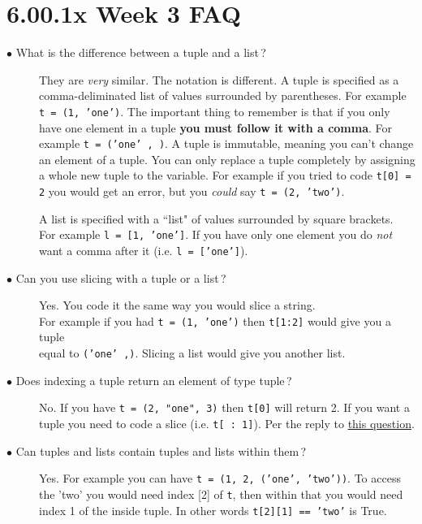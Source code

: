 \documentclass{article}
\newcommand{\inlinecode}[1]{\texttt{#1}}
\newcommand{\link}[2]{\textcolor{blue}{\href{#2}{#1}}}
\newcommand{\question}[1]{\item[$\bullet$ #1] \hfil}
\newenvironment{answer}{\newline}{}
\newenvironment{faq}{\begin{description}}{\end{description}}
\begin{document}
	
	\section*{\Huge6.00.1x Week 3 FAQ}
	
	\begin{faq}
		\question{What is the difference between a tuple and a list\,?}
		\begin{answer}
			They are \textit{very} similar. The notation is different. A tuple is specified as a comma-deliminated list of values surrounded by parentheses.  For example \inlinecode{t = (1, 'one')}.  The important thing to remember is that if you only have one element in a tuple \textbf{you must follow it with a comma}. For example \inlinecode{t = ('one' , )}. A tuple is immutable, meaning you can't change an element of a tuple.  You can only replace a tuple completely by assigning a whole new tuple to the variable.  For example if you tried to code \inlinecode{t[0] = 2} you would get an error, but you \textit{could} say \inlinecode{t = (2, 'two')}.
			
			A list is specified with a ``list" of values surrounded by square brackets.\\For example \inlinecode{l = [1, 'one']}.  If you have only one element you do \textit{not} want a comma after it (i.e. \inlinecode{l = ['one']}).
		\end{answer}
		
		\question{Can you use slicing with a tuple or a list\,?}
		\begin{answer}
			Yes.  You code it the same way you would slice a string.\\For example if you had \inlinecode{t = (1, 'one')} then \inlinecode{t[1:2]} would give you a tuple\\equal to \inlinecode{('one' ,)}. Slicing a list would give you another list.
		\end{answer}
		
		\question{Does indexing a tuple return an element of type tuple\,?}
		\begin{answer}
			No. If you have \inlinecode{t = (2,  "one", 3)} then \inlinecode{t[0]} will return 2.  If you want a tuple you need to code a slice (i.e. \inlinecode{t[ : 1]}). Per the reply to \link{this question}{https://courses.edx.org/courses/course-v1:MITx+6.00.1x+2T2017\_2/discussion/forum/35e127f944e149742273bc1b58766b721cd95c85/threads/5a6d725b24451a09d9000216}.
		\end{answer}
		
		\question{Can tuples and lists contain tuples and lists within them\,?}
		\begin{answer}
			Yes. For example you can have \inlinecode{t = (1, 2, ('one', 'two'))}. To access the 'two' you would need index [2] of \inlinecode{t}, then within that you would need index 1 of the inside tuple. In other words \inlinecode{t[2][1] == 'two'} is True.
		\end{answer}
		

\end{faq}
\end{document}
